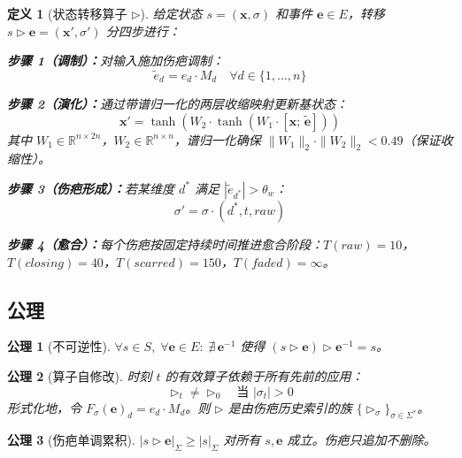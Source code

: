 \documentclass[11pt]{article}
\newtheorem{definition}[theorem]{定义}
\newtheorem{axiom}{公理}[section]
\begin{document}
\begin{definition}[状态转移算子 $\triangleright$]
\label{def:transition}
给定状态 $s = (\mathbf{x}, \sigma)$ 和事件 $\mathbf{e} \in E$，转移 $s \triangleright \mathbf{e} = (\mathbf{x}', \sigma')$ 分四步进行：

\textbf{步骤 1（调制）：}对输入施加伤疤调制：
\begin{equation}
\tilde{e}_d = e_d \cdot M_d \quad \forall d \in \{1, \ldots, n\}
\end{equation}

\textbf{步骤 2（演化）：}通过带谱归一化的两层收缩映射更新基状态：
\begin{equation}
\mathbf{x}' = \tanh(W_2 \cdot \tanh(W_1 \cdot [\mathbf{x};\, \tilde{\mathbf{e}}]))
\end{equation}
其中 $W_1 \in \mathbb{R}^{n \times 2n}$，$W_2 \in \mathbb{R}^{n \times n}$，谱归一化确保 $\|W_1\|_2 \cdot \|W_2\|_2 < 0.49$（保证收缩性）。

\textbf{步骤 3（伤疤形成）：}若某维度 $d^*$ 满足 $|\tilde{e}_{d^*}| > \theta_w$：
\begin{equation}
\sigma' = \sigma \cdot (d^*, t, raw)
\end{equation}

\textbf{步骤 4（愈合）：}每个伤疤按固定持续时间推进愈合阶段：$T(raw)=10$，$T(closing)=40$，$T(scarred)=150$，$T(faded)=\infty$。
\end{definition}

\subsection{公理}

\begin{axiom}[不可逆性]
\label{ax:scar-irrev}
$\forall s \in S,\; \forall \mathbf{e} \in E:\; \nexists\, \mathbf{e}^{-1}$ 使得 $(s \triangleright \mathbf{e}) \triangleright \mathbf{e}^{-1} = s$。
\end{axiom}

\begin{axiom}[算子自修改]
\label{ax:scar-selfmod}
时刻 $t$ 的有效算子依赖于所有先前的应用：
\begin{equation}
\triangleright_t \neq \triangleright_0 \quad \text{当 } |\sigma_t| > 0
\end{equation}
形式化地，令 $F_\sigma(\mathbf{e})_d = e_d \cdot M_d$。则 $\triangleright$ 是由伤疤历史索引的族 $\{\triangleright_\sigma\}_{\sigma \in \Sigma^*}$。
\end{axiom}

\begin{axiom}[伤疤单调累积]
\label{ax:scar-mono}
$|s \triangleright \mathbf{e}|_\Sigma \geq |s|_\Sigma$ 对所有 $s, \mathbf{e}$ 成立。伤疤只追加不删除。
\end{axiom}
\end{document}
